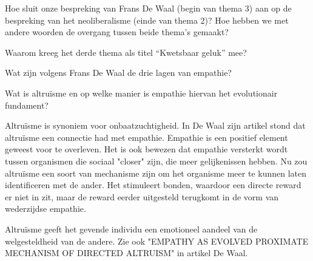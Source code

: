 \documentclass[main.tex]{subfiles}
\begin{document}
\begin{examenvraag}
    \begin{vraag}
        Hoe sluit onze bespreking van Frans De Waal (begin van thema 3) aan op de bespreking van het neoliberalisme (einde van thema 2)? Hoe hebben we met andere woorden de overgang tussen beide thema’s gemaakt?
    \end{vraag}

    \begin{antwoord}
    \end{antwoord}
\end{examenvraag}


\begin{examenvraag}
    \begin{vraag}
        Waarom kreeg het derde thema als titel “Kwetsbaar geluk” mee?
    \end{vraag}

    \begin{antwoord}
    \end{antwoord}
\end{examenvraag}


\begin{examenvraag}
    \begin{vraag}
        Wat zijn volgens Frans De Waal de drie lagen van empathie?
    \end{vraag}

    \begin{antwoord}
    \end{antwoord}
\end{examenvraag}


\begin{examenvraag}
    \begin{vraag}
        Wat is altruïsme en op welke manier is empathie hiervan het evolutionair fundament?
    \end{vraag}

    \begin{antwoord}
    	Altru\"{i}sme is synoniem voor onbaatzuchtigheid.
    	In De Waal zijn artikel stond dat altru\"{i}sme een connectie had met empathie.
		Empathie is een positief element geweest voor te overleven. 
    	Het is ook bewezen dat empathie versterkt wordt tussen organismen die sociaal "closer" zijn, die meer gelijkenissen hebben.
    	Nu zou altru\"{i}sme een soort van mechanisme zijn om het organisme meer te kunnen laten identificeren met de ander.
    	Het stimuleert bonden, waardoor een directe reward er niet in zit, maar de reward eerder uitgesteld terugkomt in de vorm
		van wederzijdse empathie. 
		
		Altru\"{i}sme geeft het gevende individu een emotioneel aandeel van de welgesteldheid van de andere.
    	Zie ook "EMPATHY AS EVOLVED PROXIMATE MECHANISM OF DIRECTED ALTRUISM" in artikel De Waal.
    	
    \end{antwoord}
\end{examenvraag}
\end{document}
